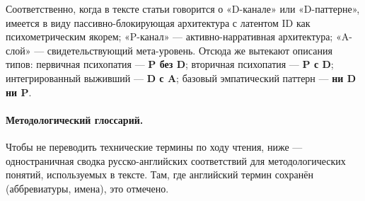 Соответственно, когда в тексте статьи говорится о «D-канале» или «D-паттерне», имеется в виду пассивно-блокирующая архитектура с латентом ID как психометрическим якорем; «P-канал» --- активно-нарративная архитектура; «A-слой» --- свидетельствующий мета-уровень. Отсюда же вытекают описания типов: первичная психопатия --- \textbf{P без D}; вторичная психопатия --- \textbf{P с D}; интегрированный выживший --- \textbf{D с A}; базовый эмпатический паттерн --- \textbf{ни D ни P}.

\paragraph{Методологический глоссарий.} Чтобы не переводить технические термины по ходу чтения, ниже --- одностраничная сводка русско-английских соответствий для методологических понятий, используемых в тексте. Там, где английский термин сохранён (аббревиатуры, имена), это отмечено.

